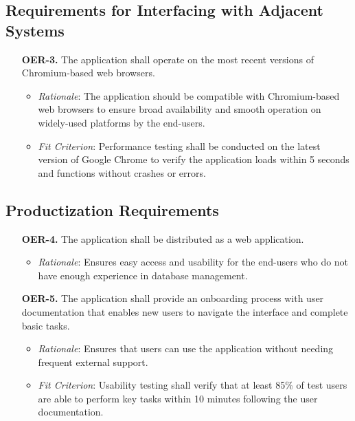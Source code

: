\documentclass[12pt]{article}
\begin{document}
\subsection{Requirements for Interfacing with Adjacent Systems}
\begin{enumerate}
  \item[\textbf{OER-3.}] The application shall operate on the most recent versions of Chromium-based web browsers.
    \begin{itemize}
      \item \textit{Rationale}: The application should be compatible with Chromium-based web browsers to ensure broad availability and smooth operation on widely-used platforms by the end-users.
      \item \textit{Fit Criterion}: Performance testing shall be conducted on
      the latest version of Google Chrome to verify the application loads within
      5 seconds and functions without crashes or errors.
    \end{itemize}
\end{enumerate}

\subsection{Productization Requirements}
\begin{enumerate}
  \item[\textbf{OER-4.}] The application shall be distributed as a web application.
    \begin{itemize}
      \item \textit{Rationale}: Ensures easy access and usability for the end-users who do not have enough experience in database management.
    \end{itemize}
  \item[\textbf{OER-5.}] The application shall provide an onboarding process
  with user documentation that enables new users to navigate the interface and
  complete basic tasks.
    \begin{itemize}
      \item \textit{Rationale}: Ensures that users can use the application without needing frequent external support.
      \item \textit{Fit Criterion}: Usability testing shall verify that at least
      85\% of test users are able to perform key tasks within 10 minutes
      following the user documentation.
    \end{itemize}
\end{enumerate}
\end{document}
